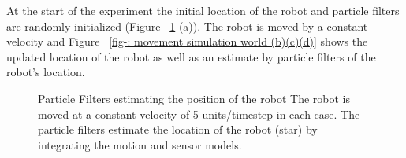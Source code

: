 \documentclass[12pt,draft]{dalcsthesis}
\begin{document}
At the start of the experiment  the initial location of the robot and particle filters are randomly initialized (Figure ~\ref{fig-: movement simulation world} (a)). The robot is moved by a constant velocity and Figure ~\ref{fig-: movement simulation world (b)(c)(d)} shows the updated location of the robot as well as an estimate by particle filters of the robot's location.



\begin{figure}
  \centering
  \qquad
  \qquad
  \qquad
  \caption{\label{fig-: movement simulation world}Particle Filters estimating the position of the robot
   The robot is moved at a constant velocity of 5 units/timestep in each case. The particle filters estimate the location of the robot (star) by integrating the motion and sensor models.}
\end{figure}
\end{document}

